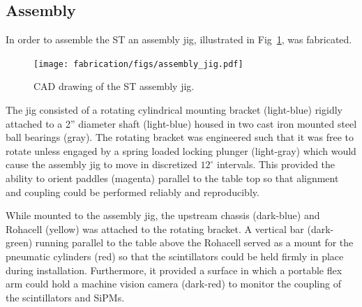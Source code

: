 
\subsection{Assembly} \label{sec:fab_ass}

In order to assemble the ST an assembly jig, illustrated in Fig~\ref{fig:ajcaddrawing}, was fabricated.  
	\begin{figure}[!htb]
		\centering
		\texttt{[image: fabrication/figs/assembly\_jig.pdf]}
		\caption{CAD drawing of the ST assembly jig.}
		\label{fig:ajcaddrawing}
	\end{figure}
The jig consisted of a rotating cylindrical mounting bracket (light-blue) rigidly attached to a 2'' diameter shaft (light-blue) housed in two cast iron mounted steel ball bearings (gray).  The rotating bracket was engineered such that it was free to rotate unless engaged by a spring loaded locking plunger (light-gray) which would cause the assembly jig to move in discretized $12^{\circ}$ intervals.  This provided the ability to orient paddles (magenta) parallel to the table top so that alignment and coupling could be performed reliably and reproducibly.

While mounted to the assembly jig, the upstream chassis (dark-blue) and Rohacell (yellow) was attached to the rotating bracket.  A vertical bar (dark-green) running parallel to the table above the Rohacell served as a mount for the pneumatic cylinders (red) so that the scintillators could be held firmly in place during installation.  Furthermore, it provided a surface in which a portable flex arm could hold a machine vision camera (dark-red) to monitor the coupling of the scintillators and SiPMs.


